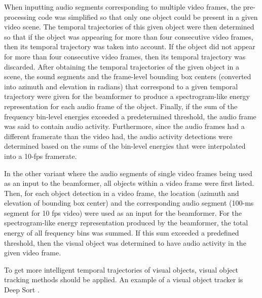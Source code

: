 When inputting audio segments corresponding to multiple video frames, the pre-processing code was simplified so that only one object could be present in a given video scene. The temporal trajectories of this given object were then determined so that if the object was appearing for more than four consecutive video frames, then its temporal trajectory was taken into account. If the object did not appear for more than four consecutive video frames, then its temporal trajectory was discarded. After obtaining the temporal trajectories of the given object in a scene, the sound segments and the frame-level bounding box centers (converted into azimuth and elevation in radians) that correspond to a given temporal trajectory were given for the beamformer to produce a spectrogram-like energy representation for each audio frame of the object. Finally, if the sum of the frequency bin-level energies exceeded a predetermined threshold, the audio frame was said to contain audio activity. Furthermore, since the audio frames had a different framerate than the video had, the audio activity detections were determined based on the sums of the bin-level energies that were interpolated into a 10-fps framerate.

In the other variant where the audio segments of single video frames being used as an input to the beamformer, all objects within a video frame were first listed. Then, for each object detection in a video frame, the location (azimuth and elevation of bounding box center) and the corresponding audio segment (100-ms segment for 10 fps video) were used as an input for the beamformer. For the spectrogram-like energy representation produced by the beamformer, the total energy of all frequency bins was summed. If this sum exceeded a predefined threshold, then the visual object was determined to have audio activity in the given video frame.

To get more intelligent temporal trajectories of visual objects, visual object tracking methods should be applied. An example of a visual object tracker is Deep Sort .

